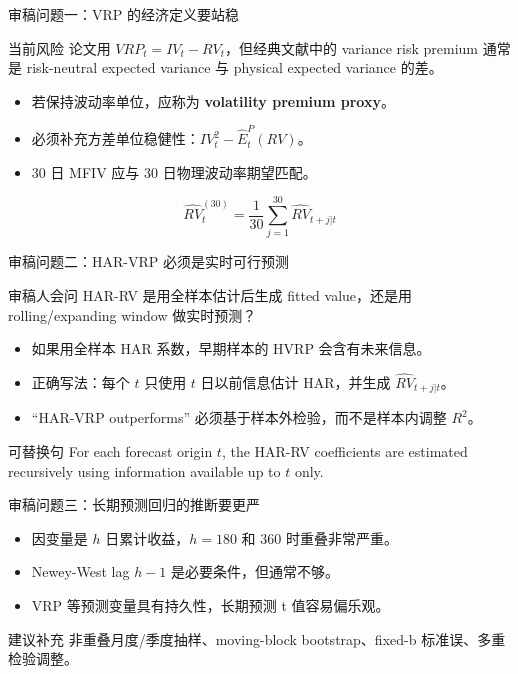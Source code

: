 \documentclass[UTF8,aspectratio=169]{ctexbeamer}
\begin{document}
\begin{frame}{审稿问题一：VRP 的经济定义要站稳}
  \begin{block}{当前风险}
    论文用 $VRP_t=IV_t-RV_t$，但经典文献中的 variance risk premium 通常是
    risk-neutral expected variance 与 physical expected variance 的差。
  \end{block}

  \begin{itemize}
    \item 若保持波动率单位，应称为 \textbf{volatility premium proxy}。
    \item 必须补充方差单位稳健性：$IV_t^2-\widehat{E}^{P}_t(RV)$。
    \item 30 日 MFIV 应与 30 日物理波动率期望匹配。
  \end{itemize}

  \[
    \widehat{RV}^{(30)}_{t}
    = \frac{1}{30}\sum_{j=1}^{30}\widehat{RV}_{t+j|t}
  \]
\end{frame}

\begin{frame}{审稿问题二：HAR-VRP 必须是实时可行预测}
  \begin{block}{审稿人会问}
    HAR-RV 是用全样本估计后生成 fitted value，还是用 rolling/expanding window 做实时预测？
  \end{block}

  \begin{itemize}
    \item 如果用全样本 HAR 系数，早期样本的 HVRP 会含有未来信息。
    \item 正确写法：每个 $t$ 只使用 $t$ 日以前信息估计 HAR，并生成 $\widehat{RV}_{t+j|t}$。
    \item ``HAR-VRP outperforms'' 必须基于样本外检验，而不是样本内调整 $R^2$。
  \end{itemize}

  \begin{exampleblock}{可替换句}
    For each forecast origin $t$, the HAR-RV coefficients are estimated recursively using information available up to $t$ only.
  \end{exampleblock}
\end{frame}

\begin{frame}{审稿问题三：长期预测回归的推断要更严}
  \begin{itemize}
    \item 因变量是 $h$ 日累计收益，$h=180$ 和 $360$ 时重叠非常严重。
    \item Newey-West lag $h-1$ 是必要条件，但通常不够。
    \item VRP 等预测变量具有持久性，长期预测 t 值容易偏乐观。
  \end{itemize}

  \vspace{0.25cm}
  \begin{block}{建议补充}
    非重叠月度/季度抽样、moving-block bootstrap、fixed-b 标准误、多重检验调整。
  \end{block}
\end{frame}
\end{document}
